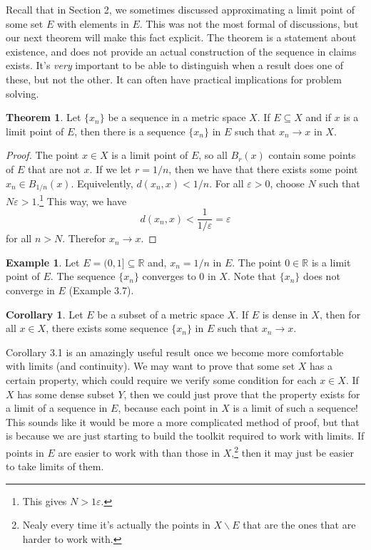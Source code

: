 \documentclass{article}
\newcommand{\R}{\mathbb{R}}
\theoremstyle{definition}
\newtheorem{theorem}{Theorem}[section]
\newtheorem{corollary}{Corollary}[section]
\newtheorem{example}{Example}[section]
\begin{document}
	Recall that in Section 2, we sometimes discussed approximating a limit point of some set $ E $ with elements in $ E $. This was not the most formal of discussions, but our next theorem will make this fact explicit. The theorem is a statement about existence, and does not provide an actual construction of the sequence in claims exists. It's \textit{very} important to be able to distinguish when a result does one of these, but not the other. It can often have practical implications for problem solving. 
	\begin{theorem}
		Let $ \{x_n\} $ be a sequence in a metric space $ X $. If $ E\subseteq X $ and if $ x $ is a limit point of $ E $, then there is a sequence $ \{x_n\} $ in $ E $ such that $ x_n\to x $ in $ X $. 
	\end{theorem}
	\begin{proof}
		The point $ x\in X $ is a limit point of $ E $, so all $ B_r(x) $ contain some points of $ E $ that are not $ x $. If we let $ r=1/n $, then we have that there exists some point $ x_n\in B_{1/n}(x) $. Equivelently, $ d(x_n,x)<1/n $. For all $ \varepsilon>0 $, choose $ N $ such that $ N\varepsilon >1 $.\footnote{This gives $ N>1\varepsilon $.} This way, we have $$ d(x_n,x)<\frac{1}{1/\varepsilon}=\varepsilon $$ for all $ n>N $. Therefor $x_n\to x$.
	\end{proof}
	\begin{example}
		Let $ E=(0,1]\subseteq\R $ and, $ x_n=1/n $ in $ E $. The point $ 0\in\R $ is a limit point of $ E $. The sequence $ \{x_n\} $ converges to $ 0 $ in $ X $. Note that $ \{x_n\} $ does not converge in $ E $ (Example 3.7).   
	\end{example}
	\begin{corollary}
		Let $ E $ be a subset of a metric space $ X $. If $ E $ is dense in $ X $, then for all $ x\in X $, there exists some sequence $ \{x_n\} $ in $ E $ such that $ x_n\to x $. 
	\end{corollary}
	Corollary 3.1 is an amazingly useful result once we become more comfortable with limits (and continuity). We may want to prove that some set $ X $ has a certain property, which could require we verify some condition for each $ x\in X $. If $ X $ has some dense subset $ Y $, then we could just prove that the property exists for a limit of a sequence in $ E $, because each point in $ X $ is a limit of such a sequence! This sounds like it would be more a more complicated method of proof, but that is because we are just starting to build the toolkit required to work with limits. If points in $ E $ are easier to work with than those in $ X $,\footnote{Nealy every time it's actually the points in $ X\backslash E $ that are the ones that are harder to work with.} then it may just be easier to take limits of them. 
\end{document}
